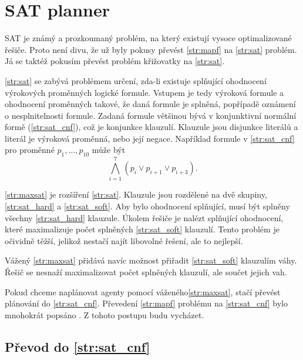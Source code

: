 \section{SAT planner}\label{sec:sat_planner}

%
%

SAT je známý a prozkoumaný problém, na který existují vysoce optimalizované řešiče.
Proto není divu, že už byly pokusy převést \ref{str:mapf} na \ref{str:sat} problém.
Já se taktéž pokusím převést problém křižovatky na \ref{str:sat}.

\ref{str:sat} se zabývá problémem určení,
zda-li existuje splňující ohodnocení výrokových proměnných logické formule.
Vstupem je tedy výroková formule a ohodnocení proměnných takové,
že daná formule je splněná, popřípadě oznámení o nesplnitelnosti formule.
Zadaná formule většinou bývá v konjunktivní normální formě (\ref{str:sat_cnf}), což je konjunkce klauzulí.
Klauzule jsou disjunkce literálů a literál je výroková proměnná, nebo její negace.
Například formule v \ref{str:sat_cnf} pro proměnné $p_1, \dots, p_{10}$ může být
\[
	\bigwedge_{i=1}^{7}(p_i \vee p_{i+1} \vee p_{i + 3}).
\]

\ref{str:maxsat} je rozšíření \ref{str:sat}.
Klauzule jsou rozdělené na dvě skupiny,
\ref{str:sat_hard} a \ref{str:sat_soft}.
Aby bylo ohodnocení splňující, musí být splněny všechny \ref{str:sat_hard} klauzule.
Úkolem řešiče je nalézt splňující ohodnocení, které maximalizuje počet splněných \ref{str:sat_soft} klauzulí.
Tento problém je očividně těžší, jelikož nestačí najít libovolné řešení, ale to nejlepší.

Vážený \ref{str:maxsat} přidává navíc možnost přiřadit \ref{str:sat_soft} klauzulím váhy.
Řešič se nesnaží maximalizovat počet splněných klauzulí, ale součet jejich vah.

Pokud chceme naplánovat agenty pomocí váženého\ref{str:maxsat}, stačí převést plánování do \ref{str:sat_cnf}.
Převedení \ref{str:mapf} problému na \ref{str:sat_cnf} bylo mnohokrát popsáno \citep{bartak}.
Z tohoto postupu budu vycházet.

\subsection{Převod do \ref{str:sat_cnf}}\label{subsec:sat_prevod_do_cnf}

